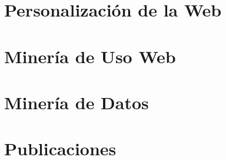 




\section{Personalización de la Web}
\label{sec:srw:personalizacion-de-la-web}






\section{Minería de Uso Web}
\label{sec:srw:muw}






\section{Minería de Datos}
\label{sec:srw:md}






\section{Publicaciones}
\label{sec:srw:publicaciones}





